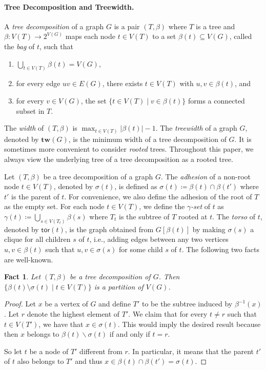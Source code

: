 \documentclass[a4paper,11pt]{article}
\numberwithin{lemma}{section}
\newtheorem{fact}[lemma]{Fact}
\newcommand{\tw}{\mathbf{tw}}
\newcommand{\tor}{\mathsf{tor}}
\begin{document}
\paragraph{Tree Decomposition and Treewidth.}
A \emph{tree decomposition} of a graph $G$ is a pair $(T,\beta)$ where $T$ is a tree and $\beta\colon V(T) \to 2^{V(G)}$ maps each node $t \in V(T)$ to a set $\beta(t) \subseteq V(G)$, called the \emph{bag} of $t$, such that
\begin{enumerate}[label = (\roman*)]
 \item $\bigcup_{t \in V(T)} \beta(t) = V(G)$,
 \item for every edge $uv \in E(G)$, there exists $t \in V(T)$ with $u,v \in \beta(t)$, and
 \item for every $v \in V(G)$, the set $\{t \in V(T) \mid v \in \beta(t)\}$ forms a connected subset in $T$.
\end{enumerate}
The \emph{width} of $(T,\beta)$ is $\max_{t \in V(T)} |\beta(t)| - 1$.
The \emph{treewidth} of a graph $G$, denoted by $\tw(G)$, is the minimum width of a tree decomposition of $G$.
It is sometimes more convenient to consider \emph{rooted} trees.
Throughout this paper, we always view the underlying tree of a tree decomposition as a rooted tree.

Let $(T,\beta)$ be a tree decomposition of a graph $G$.
The \emph{adhesion} of a non-root node $t \in V(T)$, denoted by $\sigma(t)$, is defined as $\sigma(t) \coloneqq \beta(t) \cap \beta(t')$ where $t'$ is the parent of $t$.
For convenience, we also define the adhesion of the root of $T$ as the empty set.
For each node $t \in V(T)$, we define the \emph{$\gamma$-set} of $t$ as $\gamma(t) \coloneqq \bigcup_{s \in V(T_t)} \beta(s)$ where $T_t$ is the subtree of $T$ rooted at $t$.
The \emph{torso} of $t$, denoted by $\tor(t)$, is the graph obtained from $G[\beta(t)]$ by making $\sigma(s)$ a clique for all children $s$ of $t$, i.e., adding edges between any two vertices $u,v \in \beta(t)$ such that $u,v \in \sigma(s)$ for some child $s$ of $t$.
The following two facts are well-known.

\begin{fact}\label{fact-partition}
 Let $(T,\beta)$ be a tree decomposition of $G$.
 Then $\{\beta(t) \setminus \sigma(t) \mid t \in V(T)\}$ is a partition of $V(G)$.
\end{fact}

\begin{proof}
 Let $x$ be a vertex of $G$ and define $T'$ to be the subtree induced by $\beta^{-1}(x)$.
 Let $r$ denote the highest element of $T'$.
 We claim that for every $t \neq r$ such that $t \in V(T')$, we have that $x \in \sigma(t)$. This would imply the desired result because then $x$ belongs to $\beta(t) \backslash \sigma(t)$ if and only if $t = r$.

 So let $t$ be a node of $T'$ different from $r$.
 In particular, it means that the parent $t'$ of $t$ also belongs to $T'$ and thus $x \in \beta(t) \cap \beta(t') = \sigma(t)$.
\end{proof}
\end{document}
